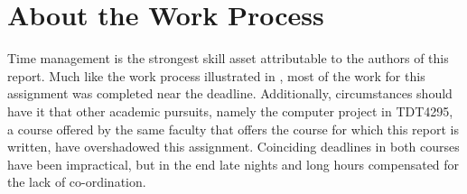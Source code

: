\section{About the Work Process}

Time management is the strongest skill asset attributable to the authors of this report.
Much like the work process illustrated in \cite{assignment-1}, most of the work for this assignment was completed near the deadline.
Additionally, circumstances should have it that other academic pursuits, namely the computer project in TDT4295, a course offered by the same faculty that offers the course for which this report is written, have overshadowed this assignment.
Coinciding deadlines in both courses have been impractical, but in the end late nights and long hours compensated for the lack of co-ordination.
